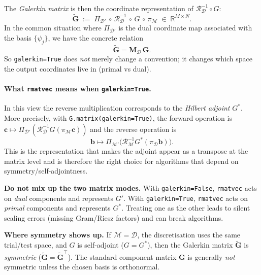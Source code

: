 \documentclass[11pt,twoside,openright]{book}
\theoremstyle{plain}
\theoremstyle{definition}
\theoremstyle{remark}
\newcommand{\modelspace}{\mathcal{M}}
\newcommand{\dataspace}{\mathcal{D}}
\newcommand{\Gd}{\mathbf{G}}              %
\newcommand{\GdGal}{\tilde{\mathbf{G}}}   %
\newcommand{\mass}{\mathbf{M}}             %
\newcommand{\Riesz}{\mathcal{R}}
\begin{document}
The \emph{Galerkin matrix} is then the coordinate representation of
$\Riesz_{\dataspace}^{-1}\circ G$:
\begin{equation}
  \label{eq:galerkin-matrix-def}
  \GdGal
  \;:=\;
  \Pi_{\dataspace'}\,\circ\, \Riesz_{\dataspace}^{-1}\,\circ\, G\,\circ\,\pi_{\modelspace}
  \;\in\; \mathbb{R}^{M\times N}.
\end{equation}
In the common situation where $\Pi_{\dataspace'}$ is the dual coordinate map
associated with the basis $\{\psi_j\}$, we have the concrete relation
\begin{equation}
  \label{eq:galerkin-vs-standard}
  \GdGal = \mass_{\dataspace}\,\Gd.
\end{equation}
So \texttt{galerkin=True} does \emph{not} merely change a convention; it
changes which space the output coordinates live in (primal vs dual).

\paragraph{What \texttt{rmatvec} means when \texttt{galerkin=True}.}
In this view the reverse multiplication corresponds to the \emph{Hilbert
adjoint} $G^*$.
More precisely, with \texttt{G.matrix(galerkin=True)}, the forward operation is
\(
  \mathbf{c} \mapsto \Pi_{\dataspace'}(\Riesz_{\dataspace}^{-1}G(\pi_{\modelspace}\mathbf{c}))
\)
and the reverse operation is
\begin{equation}
  \label{eq:galerkin-rmatvec-adjoint}
  \mathbf{b} \mapsto \Pi_{\modelspace'}\bigl(\Riesz_{\modelspace}^{-1}G^*(\pi_{\dataspace}\mathbf{b})\bigr).
\end{equation}
This is the representation that makes the adjoint appear as a transpose at the
matrix level and is therefore the right choice for algorithms that depend on
symmetry/self-adjointness.

\begin{pitfallbox}
\textbf{Do not mix up the two matrix modes.}
With \texttt{galerkin=False}, \texttt{rmatvec} acts on \emph{dual} components
and represents $G'$. With \texttt{galerkin=True}, \texttt{rmatvec} acts on
\emph{primal} components and represents $G^*$. Treating one as the other leads
to silent scaling errors (missing Gram/Riesz factors) and can break algorithms.

\medskip
\textbf{Where symmetry shows up.}
If $\modelspace=\dataspace$, the discretisation uses the same trial/test space,
and $G$ is self-adjoint ($G=G^*$), then the Galerkin matrix $\GdGal$ is
\emph{symmetric} ($\GdGal=\GdGal^\top$). The standard component matrix $\Gd$ is
generally \emph{not} symmetric unless the chosen basis is orthonormal.
\end{pitfallbox}
\end{document}

